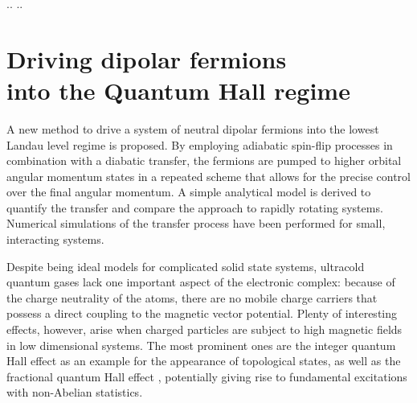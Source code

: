 \begin{tquote}{..}
    ..
\end{tquote}

\newcommand{\Ef}{E_\text{F}}
\newcommand{\up}{\uparrow}
\newcommand{\down}{\downarrow}
\newcommand{\liqhe}{L^{\star}}
\newcommand{\dl}[1]{{\hat #1}}
\newcommand{\dlCdd}{\dl{C}_\text{dd}}
\newcommand{\dlEf}{\dl{E}_\text{F}}
\newcommand{\dlliqhe}{\dl{L}^{\star}}
\newcommand{\Vdd}{\ensuremath{V_\text{dd}}\xspace}
\newcommand{\Cdd}{\ensuremath{C_\text{dd}}\xspace}

\chapter[Driving dipolar fermions into the Quantum Hall regime]{Driving dipolar fermions\texorpdfstring{\\}{ }into the Quantum Hall regime}


A new method to drive a system of neutral dipolar fermions into the lowest Landau level regime is proposed.
By employing adiabatic spin-flip processes in combination with a diabatic transfer, the fermions are pumped to higher orbital angular momentum states in a repeated scheme that allows for the precise control over the final angular momentum.
A simple analytical model is derived to quantify the transfer and compare the approach to rapidly rotating systems.
Numerical simulations of the transfer process have been performed for small, interacting systems.


Despite being ideal models for complicated solid state systems, ultracold quantum gases lack one important aspect of the electronic complex: because of the charge neutrality of the atoms, there are no mobile charge carriers that possess a direct coupling to the magnetic vector potential. Plenty of interesting effects, however, arise when charged particles are subject to high magnetic fields in low dimensional systems. The most prominent ones are the integer quantum Hall effect \cite{Klitzing1980} as an example for the appearance of topological states, as well as the fractional quantum Hall effect \cite{Laughlin1983}, potentially giving rise to fundamental excitations with non-Abelian statistics.

